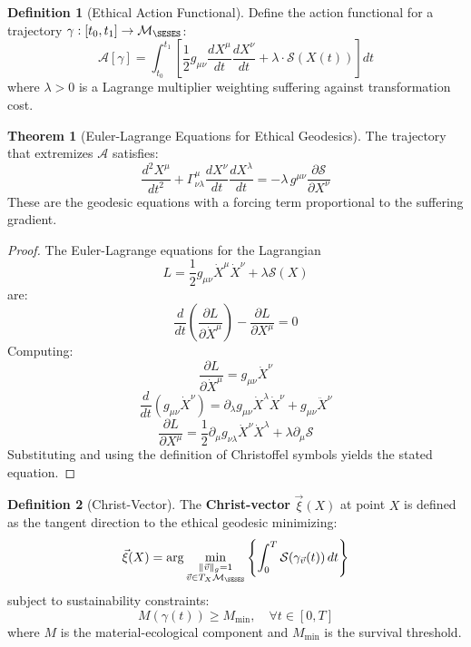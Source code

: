 \documentclass[11pt,a4paper]{article}
\theoremstyle{definition}
\newtheorem{definition}{Definition}[section]
\newtheorem{theorem}{Theorem}[section]
\theoremstyle{remark}
\begin{document}
\begin{definition}[Ethical Action Functional]
Define the action functional for a trajectory $\gamma: [t_0, t_1] \to \mathcal{M}_{\SESES}$:
\[
\mathcal{A}[\gamma] = \int_{t_0}^{t_1} \left[ \frac{1}{2} g_{\mu\nu} \frac{dX^\mu}{dt} \frac{dX^\nu}{dt} + \lambda \cdot \mathcal{S}(X(t)) \right] dt
\]
where $\lambda > 0$ is a Lagrange multiplier weighting suffering against transformation cost.
\end{definition}

\begin{theorem}[Euler-Lagrange Equations for Ethical Geodesics]
The trajectory that extremizes $\mathcal{A}$ satisfies:
\[
\frac{d^2 X^\mu}{dt^2} + \Gamma^\mu_{\nu\lambda} \frac{dX^\nu}{dt} \frac{dX^\lambda}{dt} = -\lambda \, g^{\mu\nu} \frac{\partial \mathcal{S}}{\partial X^\nu}
\]
These are the geodesic equations with a forcing term proportional to the suffering gradient.
\end{theorem}

\begin{proof}
The Euler-Lagrange equations for the Lagrangian 
\[
L = \frac{1}{2} g_{\mu\nu} \dot{X}^\mu \dot{X}^\nu + \lambda \mathcal{S}(X)
\]
are:
\[
\frac{d}{dt}\left( \frac{\partial L}{\partial \dot{X}^\mu} \right) - \frac{\partial L}{\partial X^\mu} = 0
\]
Computing:
\[
\frac{\partial L}{\partial \dot{X}^\mu} = g_{\mu\nu} \dot{X}^\nu
\]
\[
\frac{d}{dt}\left( g_{\mu\nu} \dot{X}^\nu \right) = \partial_\lambda g_{\mu\nu} \dot{X}^\lambda \dot{X}^\nu + g_{\mu\nu} \ddot{X}^\nu
\]
\[
\frac{\partial L}{\partial X^\mu} = \frac{1}{2} \partial_\mu g_{\nu\lambda} \dot{X}^\nu \dot{X}^\lambda + \lambda \partial_\mu \mathcal{S}
\]
Substituting and using the definition of Christoffel symbols yields the stated equation.
\end{proof}

\begin{definition}[Christ-Vector]
The \textbf{Christ-vector} $\vec{\xi}(X)$ at point $X$ is defined as the tangent direction to the ethical geodesic minimizing:
\[
\vec{\xi}(X) = \arg\min_{\substack{\|\vec{v}\|_g = 1 \\ \vec{v} \in T_X \mathcal{M}_{\SESES}}} \left\{ \int_0^T \mathcal{S}(\gamma_{\vec{v}}(t)) \, dt \right\}
\]
subject to sustainability constraints:
\[
M(\gamma(t)) \geq M_{\min}, \quad \forall t \in [0,T]
\]
where $M$ is the material-ecological component and $M_{\min}$ is the survival threshold.
\end{definition}
\end{document}

